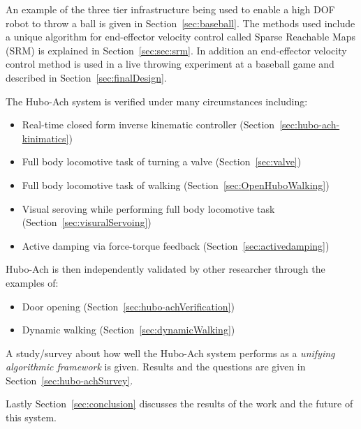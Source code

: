 An example of the three tier infrastructure being used to enable a high DOF robot to throw a ball is given in Section~\ref{sec:baseball}.
The methods used include a unique algorithm for end-effector velocity control called Sparse Reachable Maps (SRM) is explained in Section~\ref{sec:sec:srm}.
In addition an end-effector velocity control method is used in a live throwing experiment at a baseball game and described in Section~\ref{sec:finalDesign}.

The Hubo-Ach system is verified under many circumstances including:
\begin{itemize}
	\item Real-time closed form inverse kinematic controller (Section~\ref{sec:hubo-ach-kinimatics})
	\item Full body locomotive task of turning a valve (Section~\ref{sec:valve})
	\item Full body locomotive task of walking (Section~\ref{sec:OpenHuboWalking})
	\item Visual seroving while performing full body locomotive task (Section~\ref{sec:visuralServoing})
	\item Active damping via force-torque feedback (Section~\ref{sec:activedamping})
\end{itemize}




Hubo-Ach is then independently validated by other researcher through the examples of:
\begin{multicols}{2}
\begin{itemize}
	\item Door opening (Section~\ref{sec:hubo-achVerification})
	\item Dynamic walking (Section~\ref{sec:dynamicWalking})
\end{itemize}
\end{multicols}

A study/survey about how well the Hubo-Ach system performs as a \textit{unifying algorithmic framework} is given.  
Results and the questions are given in Section~\ref{sec:hubo-achSurvey}.

Lastly Section~\ref{sec:conclusion} discusses the results of the work and the future of this system.

